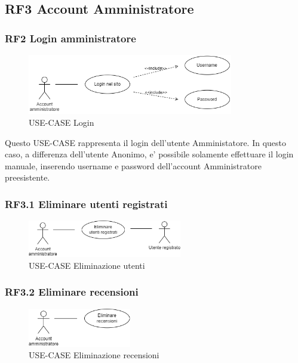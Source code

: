\documentclass[a4paper,12pt]{article}
\begin{document}
\subsection*{RF3 Account Amministratore}
\subsubsection*{RF2 Login amministratore}
\begin{figure}[H]
   \centering
   \includegraphics[width=0.8\textwidth]{img/login_amministratore.png}
    \caption{USE-CASE Login}
\end{figure}

Questo USE-CASE rappresenta il login dell'utente Amministatore.
In questo caso, a differenza dell'utente Anonimo, e' possibile solamente effettuare il login manuale, inserendo username e password dell'account Amministratore preesistente. 

\subsubsection*{RF3.1 Eliminare utenti registrati}
\begin{figure}[H]
   \centering
   \includegraphics[width=0.6\textwidth]{img/eliminazione_utenti.png}
    \caption{USE-CASE Eliminazione utenti}
\end{figure}

\subsubsection*{RF3.2 Eliminare recensioni}
\begin{figure}[H]
   \centering
   \includegraphics[width=0.4\textwidth]{img/eliminazione_recensioni.png}
    \caption{USE-CASE Eliminazione recensioni}
\end{figure}
\end{document}
